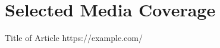 \section{Selected Media Coverage}
  \begin{description}
          {Title of Article}
          {https://example.com/}
  \end{description}
